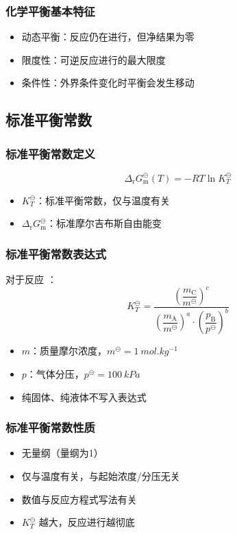 \subsubsection{化学平衡基本特征}
\begin{itemize}
\item 动态平衡：反应仍在进行，但净结果为零
\item 限度性：可逆反应进行的最大限度
\item 条件性：外界条件变化时平衡会发生移动
\end{itemize}

\subsection{标准平衡常数}
\subsubsection{标准平衡常数定义}
\[
\Delta_{\text{r}} G_{\text{m}}^\ominus(T) = -RT \ln K_T^\ominus
\]
\begin{itemize}
\item $K_T^\ominus$：标准平衡常数，仅与温度有关
\item $\Delta_{\text{r}} G_{\text{m}}^\ominus$：标准摩尔吉布斯自由能变
\end{itemize}

\subsubsection{标准平衡常数表达式}
对于反应 ：
\[
K_T^\ominus = \frac{\left(\dfrac{m_{\text{C}}}{m^\ominus}\right)^c}{\left(\dfrac{m_{\text{A}}}{m^\ominus}\right)^a \cdot \left(\dfrac{p_{\text{B}}}{p^\ominus}\right)^b}
\]
\begin{itemize}
\item $m$：质量摩尔浓度，$m^\ominus = \SI{1}{mol.kg^{-1}}$
\item $p$：气体分压，$p^\ominus = \SI{100}{kPa}$
\item 纯固体、纯液体不写入表达式
\end{itemize}

\subsubsection{标准平衡常数性质}
\begin{itemize}
\item 无量纲（量纲为1）
\item 仅与温度有关，与起始浓度/分压无关
\item 数值与反应方程式写法有关
\item $K_T^\ominus$ 越大，反应进行越彻底
\end{itemize}

